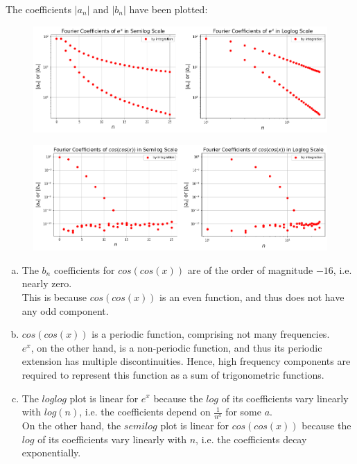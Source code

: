 \documentclass[12pt, a4paper]{article}
\begin{document}
The coefficients $|a_n|$ and $|b_n|$ have been plotted:
\begin{figure}[H]
    \centering
    \includegraphics[scale=0.39]{3a.png}
\end{figure}
\begin{figure}[H]
    \centering
    \includegraphics[scale=0.39]{3b.png}
\end{figure}


\begin{enumerate}[(a)]
    \item The $b_n$ coefficients for $cos(cos(x))$ are of the order of magnitude $-16$, i.e. nearly zero. \\
          This is because $cos(cos(x))$ is an even function, and thus does not have any odd component.
    \item $cos(cos(x))$ is a periodic function, comprising not many frequencies. \\
          $e^x$, on the other hand, is a non-periodic function, and thus its periodic extension has multiple
          discontinuities. Hence, high frequency components are required to represent this function as a sum
          of trigonometric functions.
    \item The $loglog$ plot is linear for $e^x$ because the $log$ of its coefficients vary linearly with
          $log(n)$, i.e. the coefficients depend on $\frac{1}{n^a}$ for some $a$. \\
          On the other hand, the $semilog$ plot is linear for $cos(cos(x))$ because the $log$ of its
          coefficients vary linearly with $n$, i.e. the coefficients decay exponentially.
\end{enumerate}
\end{document}
